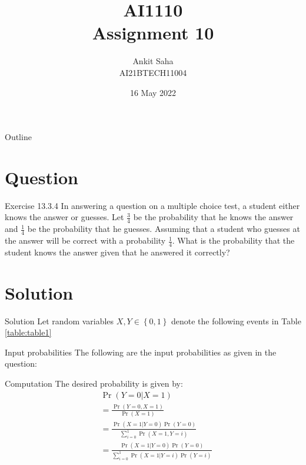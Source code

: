 \documentclass{beamer}
\title{AI1110 \\ Assignment 10}
\author{Ankit Saha \\ AI21BTECH11004}
\date{16 May 2022}
\providecommand{\pr}[1]{\ensuremath{\Pr\left(#1\right)}}
\providecommand{\cbrak}[1]{\ensuremath{\left\{#1\right\}}}
\begin{document}
	\begin{frame}
		\titlepage
	\end{frame}
	
	\begin{frame}{Outline}
    		\tableofcontents
	\end{frame}
	
	\section{Question}
	\begin{frame}{Exercise 13.3.4}
	In answering a question on a multiple choice test, a student either knows the answer or guesses. Let $\frac34$ be the probability that he knows the answer and $\frac14$ be the probability that he guesses. Assuming that a student who guesses at the answer will be correct with a probability $\frac14$. What is the probability that the student knows the answer given that he answered it correctly?
	\end{frame}
	
	\section{Solution}
	\begin{frame}{Solution}
	Let random variables $X, Y \in \cbrak{0,1}$ denote the following events in Table \eqref{table:table1}
	\begin{table}[ht!]
		\centering
		
		\caption{Description of events}
		\label{table:table1}	
	\end{table}
	\end{frame}
		
	\begin{frame}{Input probabilities}
	The following are the input probabilities as given in the question:
	\begin{table}[ht!]
		\centering
		
		\caption{Input probabilities}
		\label{table:table2}	
	\end{table}
	\end{frame}

	\begin{frame}{Computation}
	The desired probability is given by:
	\begin{align}
		&\pr{Y = 0|X = 1} \\ 
		&= \frac{\pr{Y = 0,X = 1}}{\pr{X = 1}} \\
		&= \frac{\pr{X = 1|Y = 0}\pr{Y = 0}}{\sum_{i=0}^1 \pr{X = 1,Y = i}} \\
		&= \frac{\pr{X = 1|Y = 0}\pr{Y = 0}}{\sum_{i=0}^1 \pr{X = 1|Y = i}\pr{Y = i}}
	\end{align}
	\end{frame}
	
\end{document}
